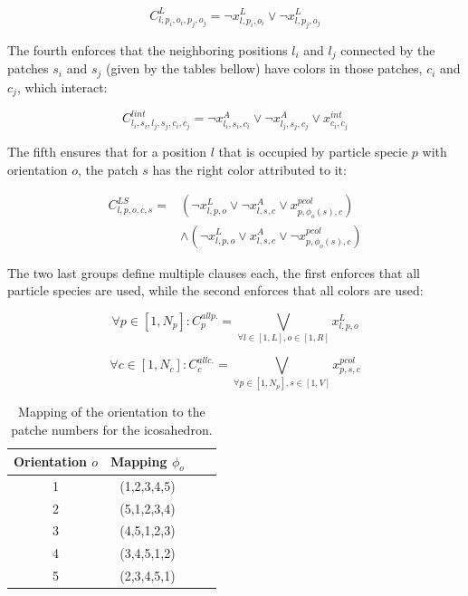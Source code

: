 \documentclass[a4paper, amsfonts, amssymb, amsmath, reprint, showkeys, nofootinbib, twoside]{revtex4-1}
\begin{document}
\begin{equation}
C^{L}_{l,p_i,o_i,p_j,o_j}=\neg x_{l,p_i,o_i}^{L} \vee \neg x_{l,p_j,o_j}^{L}
\end{equation}

The fourth enforces that the neighboring positions $l_i$ and $l_j$ connected by the patches $s_i$ and $s_j$ (given by the tables bellow) have colors in those patches, $c_i$ and $c_j$, which interact:

\begin{equation}
C^{lint}_{l_i,s_i,l_j,s_j,c_i,c_j}=\neg x_{l_i,s_i,c_i}^{A} \vee \neg x_{l_j,s_j,c_j}^{A} \vee x_{c_i,c_j}^{int}
\end{equation}

The fifth ensures that for a position $l$ that is occupied by particle specie $p$ with orientation $o$, the patch $s$ has the right color attributed to it:

\begin{equation}
\begin{split}
C^{LS}_{l,p,o,c,s}= & ( \neg x_{l,p,o}^{L} \vee \neg x_{l,s,c}^{A} \vee x_{p,\phi_o(s), c}^{pcol} ) \\ 
& \wedge ( \neg x_{l,p,o}^{L} \vee x_{l,s,c}^{A} \vee \neg x_{p,\phi_o(s), c}^{pcol} )
\end{split}
\end{equation}

The two last groups define multiple clauses each, the first enforces that all particle species are used, while the second enforces that all colors are used:

\begin{equation}
\forall p\in [1, N_p]:C_p^{all p.}= \underset{\forall l \in [1,L], o\in [1,R]}{\bigvee} x_{l,p,o}^L
\end{equation}

\begin{equation}
\forall c\in [1, N_c]:C_c^{all c.}= \underset{\forall p \in [1,N_p], s\in [1,V]}{\bigvee} x_{p,s,c}^{pcol}
\end{equation}

\begin{table}[h!]
	\begin{center}
		\begin{tabular}{ cccc } 
			\hline
			Orientation $o$ & Mapping $\phi_o$ \\
			\hline
			1 & (1,2,3,4,5) \\ 
			2 & (5,1,2,3,4) \\ 
			3 & (4,5,1,2,3) \\ 
			4 & (3,4,5,1,2) \\
			5 & (2,3,4,5,1) \\
			\hline
		\end{tabular}
		\caption{Mapping of the orientation to the patche numbers for the icosahedron.}
	\end{center}
\end{table}
\end{document}
